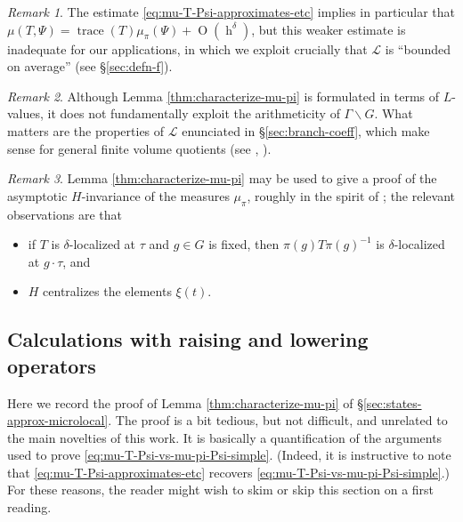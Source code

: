 \documentclass[reqno,10pt]{amsart}
\theoremstyle{plain} %
\theoremstyle{definition}
\theoremstyle{plain} %
\theoremstyle{remark}
\newtheorem{remark}             {Remark}
\theoremstyle{itplain} %
\theoremstyle{remark} %
\numberwithin{equation}{section}
\DeclareMathOperator{\trace}{trace}
\def\O{\operatorname{O}}
\DeclareMathOperator{\h}{h}
\begin{document}
\begin{remark}
  The estimate \eqref{eq:mu-T-Psi-approximates-etc} implies in particular that $\mu(T,\Psi) = \trace(T) \mu_\pi(\Psi) + \O(\h^\delta)$, but this weaker estimate is inadequate for our applications, in which we exploit crucially that $\mathcal{L}$ is ``bounded on average'' (see \S\ref{sec:defn-f}).
\end{remark}

\begin{remark}
  Although Lemma \ref{thm:characterize-mu-pi} is formulated in terms of $L$-values, it does not fundamentally exploit the arithmeticity of $\Gamma \backslash G$.  What matters are the properties of $\mathcal{L}$ enunciated in \S\ref{sec:branch-coeff}, which make sense for general finite volume quotients (see \cite[\S1.4]{nelson-venkatesh-1}, \cite{MR2726097}).
\end{remark}

\begin{remark}
  Lemma \ref{thm:characterize-mu-pi} may be used to give a proof of the asymptotic $H$-invariance of the measures $\mu_\pi$, roughly in the spirit of \cite[\S26.5]{nelson-venkatesh-1}; the relevant observations are that
  \begin{itemize}
  \item if $T$ is $\delta$-localized at $\tau$ and $g \in G$ is fixed, then $\pi(g) T \pi(g)^{-1}$ is $\delta$-localized at $g \cdot \tau$, and
  \item $H$ centralizes the elements $\xi(t)$.
  \end{itemize}
\end{remark}

\subsection{Calculations with raising and lowering operators}\label{sec:calc-with-rais}
Here we record the proof of Lemma \ref{thm:characterize-mu-pi} of \S\ref{sec:states-approx-microlocal}.  The proof is a bit tedious, but not difficult, and unrelated to the main novelties of this work.  It is basically a quantification of the arguments used to prove \eqref{eq:mu-T-Psi-vs-mu-pi-Psi-simple}.  (Indeed, it is instructive to note that \eqref{eq:mu-T-Psi-approximates-etc} recovers \eqref{eq:mu-T-Psi-vs-mu-pi-Psi-simple}.)  For these reasons, the reader might wish to skim or skip this section on a first reading.
\end{document}
